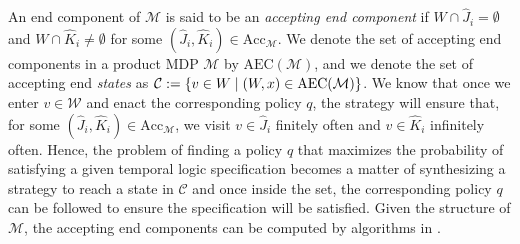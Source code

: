 An end component of $\mathcal{M}$ is said to be an \textit{accepting end
component} if $W \cap \hat{J}_i = \emptyset$ and $W \cap \hat{K}_i \neq
\emptyset$ for some $(\hat{J}_i,\hat{K}_i) \in \textrm{Acc}_\mathcal{M}$.
We denote the set of accepting end components in a product MDP $\mathcal{M}$
by $\textrm{AEC}(\mathcal{M})$, and we denote the set of accepting end \textit{states} as
$\mathcal{C} := \{v \in W \mathrel{\mid} (W,x) \in \textrm{AEC}(\mathcal{M})\}$. We know that once we
enter $v \in \mathcal{W}$ and enact the corresponding policy $q$, the strategy will
ensure that, for some $(\hat{J}_i,\hat{K}_i) \in \textrm{Acc}_\mathcal{M}$, we visit $v
\in \hat{J}_i$ finitely often and $v \in \hat{K}_i$ infinitely often. Hence, the
problem of finding a policy $q$ that maximizes the probability of satisfying a
given temporal logic specification becomes a matter of synthesizing a strategy to reach a
state in $\mathcal{C}$ and once inside the set, the corresponding policy $q$ can be
followed to ensure the specification will be satisfied. Given the structure of $\mathcal{M}$, the accepting end components can be computed by algorithms in \cite{BaierKatoen08}. 


